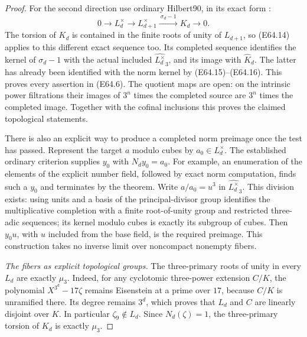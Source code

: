 \begin{proof}
For the second direction use ordinary Hilbert90, in its exact form
\cite[II, Proposition1.22 and Corollary1.23]{E_MilneCFT}:
\[
 0\longrightarrow L_d^\times\longrightarrow L_{d+1}^\times
                  \xrightarrow{\ \sigma_d-1\ }K_d\longrightarrow0 .
 \tag{E64.17}
\]
The torsion of $K_d$ is contained in the finite roots of unity of
$L_{d+1}$, so (E64.14) applies to this different exact sequence too.
Its completed sequence identifies the kernel of $\sigma_d-1$
with the actual included $\widehat{L_d^\times}_3$, and its image
with $\widehat K_d$. The latter has already been identified with
the norm kernel by (E64.15)--(E64.16).
This proves every assertion in (E64.6).
The quotient maps are open: on the intrinsic power filtrations their
images of $3^n$ times the completed source are $3^n$ times the
completed image. Together with the cofinal inclusions this proves
the claimed topological statements.

There is also an explicit way to produce a completed norm preimage
once the test has passed. Represent the target $a$ modulo cubes by
$a_0\in L_d^\times$. The established ordinary criterion supplies
$y_0$ with $N_dy_0=a_0$. For example, an enumeration of the elements
of the explicit number field, followed by exact norm computation,
finds such a $y_0$ and terminates by the theorem.
Write $a/a_0=u^3$ in $\widehat{L_d^\times}_3$. This division exists:
using units and a basis of the principal-divisor group identifies
the multiplicative completion with a finite root-of-unity group
and restricted three-adic sequences; its kernel modulo cubes is
exactly its subgroup of cubes.
Then $y_0u$, with $u$ included from the base field, is the required
preimage. This construction takes no inverse limit over
noncompact nonempty fibers.

\emph{The fibers as explicit topological groups.}
The three-primary roots of unity in every $L_d$ are exactly $\mu_3$.
Indeed, for any cyclotomic three-power extension $C/K$, the polynomial
$X^{3^d}-17\zeta$ remains Eisenstein at a prime over $17$, because
$C/K$ is unramified there. Its degree remains $3^d$, which proves
that $L_d$ and $C$ are linearly disjoint over $K$.
In particular $\zeta_9\notin L_d$.
Since $N_d(\zeta)=1$, the three-primary torsion of $K_d$ is exactly
$\mu_3$.


\end{proof}
